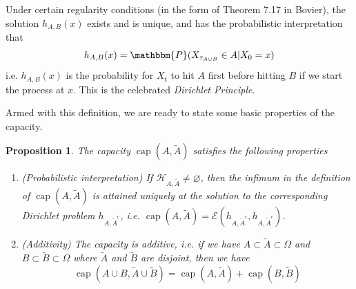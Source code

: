 \documentclass[english, aip, jcp, priprint, graphicx]{revtex4-1}
\newtheorem{proposition}{Proposition}
\theoremstyle{plain}
\theoremstyle{definition}
\theoremstyle{plain}
\begin{document}
Under certain regularity conditions (in the form of Theorem 7.17 in
Bovier\cite{Bovier2016-ez}), the solution $h_{A, B} (x)$ exists and is
unique, and has the probabilistic interpretation that
\[ h_{A, B} (x) =\mathbbm{P} (X_{\tau_{A \cup B}} \in A|X_0 = x) \]
i.e. $h_{A, B} (x)$ is the probability for $X_t$ to hit $A$ first before
hitting $B$ if we start the process at $x$. This is the celebrated
{\itshape{Dirichlet Principle}}.

Armed with this definition, we are ready to state some basic properties of the
capacity.

\begin{proposition}\label{prop:capacity}
The capacity $\ensuremath{\operatorname{cap}} (A, \tilde{A})$ satisfies the
following properties
\begin{enumerate}
\item (Probabilistic interpretation) If $\mathcal{H}_{A, \tilde{A}} \neq
\varnothing$, then the infimum in the definition of
$\ensuremath{\operatorname{cap}} (A, \tilde{A})$ is attained uniquely at
the solution to the corresponding Dirichlet problem $h_{A, \tilde{A}^c}$,
i.e. $\ensuremath{\operatorname{cap}} (A, \tilde{A}) = \mathcal{E} (h_{A,
\tilde{A}^c}, h_{A, \tilde{A}^c})$.

\item (Additivity) The capacity is additive, i.e. if we have $A \subset
\tilde{A} \subset \Omega$ and $B \subset \tilde{B} \subset \Omega$ where
$\tilde{A}$ and $\tilde{B}$ are disjoint, then we have
\[ \ensuremath{\operatorname{cap}} (A \cup B, \tilde{A} \cup \tilde{B})
=\ensuremath{\operatorname{cap}} (A, \tilde{A})
+\ensuremath{\operatorname{cap}} (B, \tilde{B}) \]
\end{enumerate}
\end{proposition}
\end{document}
